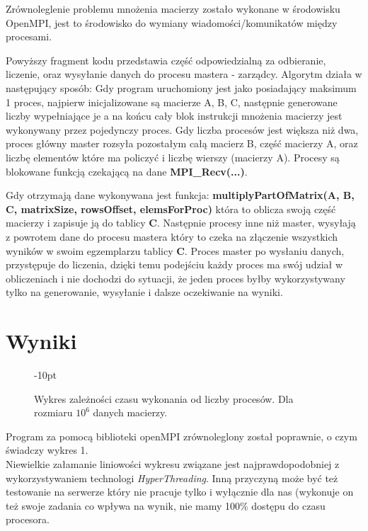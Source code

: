 \documentclass[a4paper,12pt]{article}
\begin{document}
Zrównoleglenie problemu mnożenia macierzy zostało wykonane w środowisku OpenMPI, jest to środowisko do wymiany wiadomości/komunikatów między procesami.

Powyższy fragment kodu przedstawia część odpowiedzialną za odbieranie, liczenie, oraz wysyłanie danych do procesu mastera - zarządcy. Algorytm działa w następujący sposób:
Gdy program uruchomiony jest jako posiadający maksimum 1 proces, najpierw inicjalizowane są macierze A, B, C, następnie generowane liczby wypełniające je a na końcu cały blok instrukcji mnożenia macierzy jest wykonywany przez pojedynczy proces. 
Gdy liczba procesów jest większa niż dwa, proces główny master rozsyła pozostałym całą macierz B, część macierzy A, oraz liczbę elementów które ma policzyć i liczbę wierszy (macierzy A). 
Procesy są blokowane funkcją czekającą na dane \textbf{MPI\_Recv(...)}.

Gdy otrzymają dane wykonywana jest funkcja: \textbf{multiplyPartOfMatrix(A, B, C, matrixSize, rowsOffset, elemsForProc)} która to oblicza swoją część macierzy i zapisuje ją do tablicy \textbf{C}. Następnie procesy inne niż master, wysyłają z powrotem dane do procesu mastera który to czeka na złączenie wszystkich wyników w swoim egzemplarzu tablicy \textbf{C}. Proces master po wysłaniu danych, przystępuje do liczenia, dzięki temu podejściu każdy proces ma swój udział w obliczeniach i nie dochodzi do sytuacji, że jeden proces byłby wykorzystywany tylko na generowanie, wysyłanie i dalsze oczekiwanie na wyniki.


\section*{Wyniki}

\begin{wrapfigure}{l}{0.6\textwidth}
	\vbox{-10pt}
	\resizebox{1.0\linewidth}{!}{}    
    \caption{Wykres zależności czasu wykonania od liczby procesów. Dla rozmiaru $10^6$ danych 	macierzy.}
\end{wrapfigure}

Program za pomocą biblioteki openMPI zrównoleglony został poprawnie,
o czym świadczy wykres 1. \\
Niewielkie załamanie liniowości wykresu związane jest najprawdopodobniej z wykorzystywaniem technologi \textit{HyperThreading}. 
Inną przyczyną może być też testowanie na serwerze który nie pracuje tylko i wyłącznie dla nas (wykonuje on też swoje zadania co wpływa na wynik, nie mamy 100\% dostępu do czasu procesora. 
\clearpage
\end{document}
